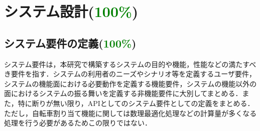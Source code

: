 \section{システム設計(\textcolor{green}{100\%})}
  \label{sec:システム設計}
    \par
  
  \subsection{システム要件の定義(\textcolor{green}{100\%})}
    \label{sec:システム要件の定義}
      \par システム要件は，本研究で構築するシステムの目的や機能，性能などの満たすべき要件を指す．システムの利用者のニーズやシナリオ等を定義するユーザ要件，システムの機能面における必要動作を定義する機能要件，システムの機能以外の面におけるシステムの振る舞いを定義する非機能要件に大別してまとめる．また，特に断りが無い限り，APIとしてのシステム要件としての定義をまとめる．ただし，自転車割り当て機能に関しては数理最適化処理などの計算量が多くなる処理を行う必要があるためこの限りではない．

